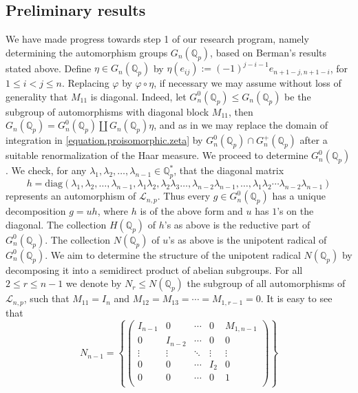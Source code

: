 \documentclass[12pt]{article}
\begin{document}
\subsection{Preliminary results}
\label{preliminary.results}
We have made progress towards step 1 of our research program, namely determining the automorphism groups $G_{n}(\mathbb{Q}_p)$, based on Berman's results stated above.
Define $\eta\in{G_{n}(\mathbb{Q}_p)}$ by $\eta(e_{ij}):=(-1)^{j-i-1}e_{n+1-j,n+1-i}$, for $1\leq{i}<{j}\leq{n}$. Replacing $\varphi$ by $\varphi\circ\eta$, if necessary we may assume without loss of generality that $M_{11}$ is diagonal. Indeed, let $G_{n}^{0}(\mathbb{Q}_{p})\leq{G_{n}(\mathbb{Q}_{p})}$ be the subgroup of automorphisms with diagonal block $M_{11}$, then $G_{n}(\mathbb{Q}_{p})=G_{n}^{0}(\mathbb{Q}_{p})\coprod{G_{n}(\mathbb{Q}_{p})}\eta$, and as in \cite{DuSautoyLubotzky} we may replace the domain of integration in \eqref{equation.proisomorphic.zeta} by $G_{n}^{0}(\mathbb{Q}_{p})\cap{G_{n}^{+}(\mathbb{Q}_{p})}$ after a suitable renormalization of the Haar measure. We proceed to determine $G_{n}^{0}(\mathbb{Q}_{p})$.
We check, for any $\lambda_{1},\lambda_{2},\dots,\lambda_{n-1}\in\mathbb{Q}_{p}^{\ast}$, that the diagonal matrix \[h=\mathrm{diag}(\lambda_{1},\lambda_{2},\dots,\lambda_{n-1},\lambda_{1}\lambda_{2},\lambda_{2}\lambda_{3}\dots,\lambda_{n-2}\lambda_{n-1},\dots,\lambda_{1}\lambda_{2}\cdots\lambda_{n-2}\lambda_{n-1})\]
represents an automorphism of $\mathcal{L}_{n,p}$. Thus every $g\in{G_{n}^{0}(\mathbb{Q}_{p})}$ has a unique decomposition $g=uh$, where $h$ is of the above form and $u$ has $1$'s on the diagonal. The collection $H(\mathbb{Q}_{p})$ of $h$'s as above is the reductive part of $G_{n}^{0}(\mathbb{Q}_{p})$. The collection $N(\mathbb{Q}_{p})$ of $u$'s as above is the unipotent radical of $G_{n}^{0}(\mathbb{Q}_{p})$. We aim to determine the structure of the unipotent radical $N(\mathbb{Q}_p)$ by decomposing it into a semidirect product of abelian subgroups.
For all $2\leq{r}\leq{n-1}$ we denote by $N_{r}\leq{N(\mathbb{Q}_{p})}$ the subgroup of all automorphisms of $\mathcal{L}_{n,p}$, such that $M_{11}=I_{n}$ and $M_{12}=M_{13}=\cdots=M_{1,r-1}=0$. It is easy to see that \[
N_{n-1}=\left\{\begin{pmatrix}
I_{n-1} & 0 & \cdots & 0 & M_{1,n-1}\\
0 & I_{n-2} & \cdots & 0 & 0\\
\vdots & \vdots & \ddots & \vdots & \vdots\\
0 & 0 & \cdots & I_{2} & 0\\
0 & 0 & \cdots & 0 & 1\\
\end{pmatrix}\right\}
\]
\end{document}
